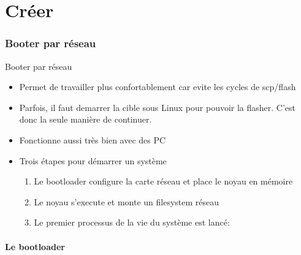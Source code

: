 %
%

\part{Créer}

\begin{frame}
  \partpage
\end{frame}

\begin{frame}
  \tableofcontents[currentpart]
\end{frame}

\section{Booter par réseau}

\begin{frame}{Booter par réseau}
  \begin{itemize}
  \item Permet de travailler  plus confortablement car evite les cycles
    de scp/flash
  \item Parfois, il faut demarrer  la cible sous Linux pour pouvoir la
    flasher.  C'est donc la seule manière de continuer.
  \item Fonctionne aussi très bien avec des PC
  \item Trois étapes pour démarrer un système
    \begin{enumerate}
    \item Le bootloader configure la carte réseau et place le noyau en
      mémoire
    \item Le noyau s'execute et monte un filesystem réseau
    \item Le premier processus de la vie du système est lancé: 
    \end{enumerate}
    \end{itemize}
\end{frame}

\subsection{Le bootloader}

